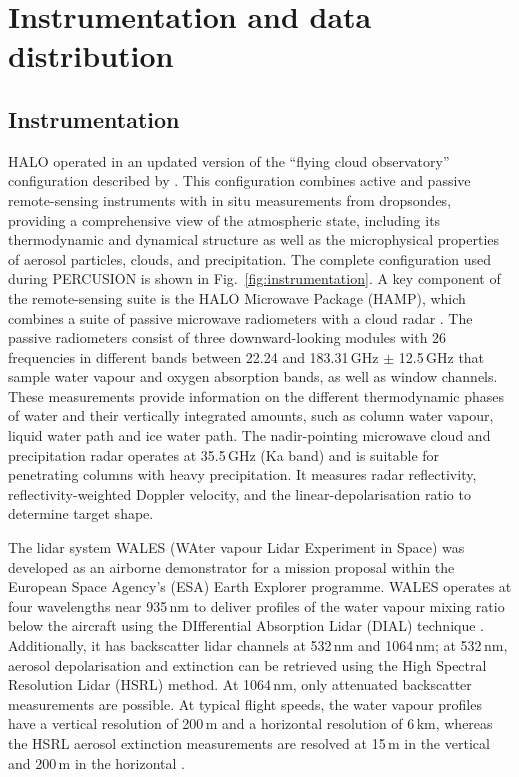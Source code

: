 \documentclass[acp, manuscript]{copernicus}
\begin{document}
\section{Instrumentation and data distribution}
\label{sec:data}

\subsection{Instrumentation}
\label{sec:instrumentation}

HALO operated in an updated version of the “flying cloud observatory” configuration described by \cite{stevensHighAltitudeLongRangeAircraft2019}. This configuration combines active and passive remote-sensing instruments with in situ measurements from dropsondes, providing a comprehensive view of the atmospheric state, including its thermodynamic and dynamical structure as well as the microphysical properties of aerosol particles, clouds, and precipitation. The complete configuration used during PERCUSION is shown in Fig.~\ref{fig:instrumentation}.
A key component of the remote-sensing suite is the HALO Microwave Package (HAMP), which combines a suite of passive microwave radiometers with a cloud radar \citep{mechHAMPMicrowavePackage2014, ewaldCalibration35GHz2019}. The passive radiometers consist of three downward-looking modules with 26 frequencies in different bands between 22.24 and 183.31\,\unit{GHz} $\pm$ 12.5\,\unit{GHz} that sample water vapour and oxygen absorption bands, as well as window channels. These measurements provide information on the different thermodynamic phases of water and their vertically integrated amounts, such as column water vapour, liquid water path and ice water path. The nadir-pointing microwave cloud and precipitation radar operates at 35.5\,\unit{GHz} (Ka band) and is suitable for penetrating columns with heavy precipitation. It measures radar reflectivity, reflectivity-weighted Doppler velocity, and the linear-depolarisation ratio to determine target shape.

The lidar system WALES (WAter vapour Lidar Experiment in Space) was developed as an airborne demonstrator for a mission proposal within the European Space Agency's (ESA) Earth Explorer programme. WALES operates at four wavelengths near 935\,\unit{nm} to deliver profiles of the water vapour mixing ratio below the aircraft using the DIfferential Absorption Lidar (DIAL) technique \citep{wirthAirborneMultiwavelengthWater2009}. 
Additionally, it has backscatter lidar channels at 532\,\unit{nm} and 1064\,\unit{nm}; at 532\,\unit{nm}, aerosol depolarisation and extinction can be retrieved using the High Spectral Resolution Lidar (HSRL) method. At 1064\,\unit{nm}, only attenuated backscatter measurements are possible. 
At typical flight speeds, the water vapour profiles have a vertical resolution of 200\,\unit{m} and a horizontal resolution of 6\,\unit{km}, whereas the HSRL aerosol extinction measurements are resolved at 15\,\unit{m} in the vertical and 200\,\unit{m} in the horizontal \citep{stevensHighAltitudeLongRangeAircraft2019}.
\end{document}
